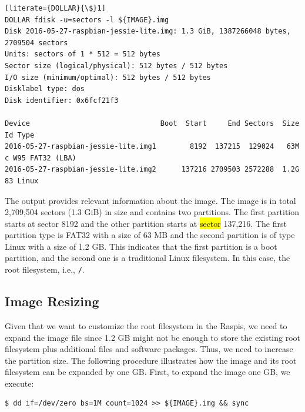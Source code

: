 \documentclass[electronics,article,accept,moreauthors,pdftex,10pt,a4paper]{mdpi}
\theoremstyle{mdpi}
\newcounter{ex}
\newcounter{re}
\theoremstyle{mdpidefinition}
\begin{document}
\begin{lstlisting}[literate={DOLLAR}{\$}1]
DOLLAR fdisk -u=sectors -l ${IMAGE}.img
Disk 2016-05-27-raspbian-jessie-lite.img: 1.3 GiB, 1387266048 bytes, 2709504 sectors
Units: sectors of 1 * 512 = 512 bytes
Sector size (logical/physical): 512 bytes / 512 bytes
I/O size (minimum/optimal): 512 bytes / 512 bytes
Disklabel type: dos
Disk identifier: 0x6fcf21f3

Device                               Boot  Start     End Sectors  Size Id Type
2016-05-27-raspbian-jessie-lite.img1        8192  137215  129024   63M  c W95 FAT32 (LBA)
2016-05-27-raspbian-jessie-lite.img2      137216 2709503 2572288  1.2G 83 Linux
\end{lstlisting}
\FloatBarrier
\vspace{-5mm}

The output provides relevant information about the image. The image is in
total 2,709,504 sectors (1.3 GiB) in size and contains two partitions. The
first partition starts at sector 8192 and the other partition starts at
\hl{sector} 137,216. The first partition type is FAT32 with a size of 63 MB
and the second partition is of type Linux with a size of 1.2 GB. This
indicates that the first partition is a boot partition, and the second
one is a traditional Linux filesystem. In this case, the root filesystem, i.e., \texttt{/}.
\subsection{Image Resizing}
Given that we want to customize the root filesystem in the Raspis,
we need to expand the image file since 1.2 GB might not be enough to store
the existing root filesystem plus additional files and software packages.
Thus,
we need to increase the partition size. The following procedure illustrates
how the image and its root filesystem can be expanded by one GB.
First, to expand the image one GB, we execute:

\begin{lstlisting}[]
$ dd if=/dev/zero bs=1M count=1024 >> ${IMAGE}.img && sync
\end{lstlisting}
\FloatBarrier
\vspace{-5mm}
\end{document}
